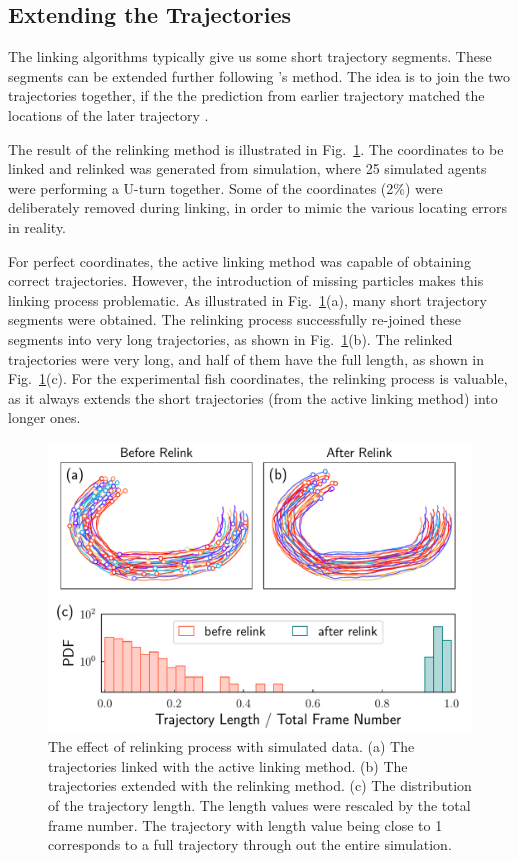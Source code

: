\documentclass[11pt,twoside]{report}
\begin{document}
\subsection{Extending the Trajectories}

The linking algorithms typically give us some short trajectory segments. These segments can be extended further following \citeauthor{xu2008}'s method. The idea is to join the two trajectories together, if the the prediction from earlier trajectory matched the locations of the later trajectory \cite{xu2008}.

The result of the relinking method is illustrated in Fig.~\ref{fig:relink}. The coordinates to be linked and relinked was generated from simulation, where 25 simulated agents were performing a U-turn together. Some of the coordinates (2\%) were deliberately removed during linking, in order to mimic the various locating errors in reality. 

For perfect coordinates, the active linking method was capable of obtaining correct trajectories. However, the introduction of missing particles makes this linking process problematic. As illustrated in Fig.~\ref{fig:relink}(a), many short trajectory segments were obtained. The relinking process successfully re-joined these segments into very long trajectories, as shown in Fig.~\ref{fig:relink}(b). The relinked trajectories were very long, and half of them have the full length, as shown in Fig.~\ref{fig:relink}(c). For the experimental fish coordinates, the relinking process is valuable, as it always extends the short trajectories (from the active linking method) into longer ones.


\begin{figure}
  \includegraphics[width=\linewidth]{relink}
  \caption[The effect of relinking]{
  	The effect of relinking process with simulated data.
  	(a) The trajectories linked with the active linking method.
  	(b) The trajectories extended with the relinking method.
  	(c) The distribution of the trajectory length. The length values were rescaled by the total frame number. The trajectory with length value being close to 1 corresponds to a full trajectory through out the entire simulation.
  }
  \label{fig:relink}
\end{figure}
\end{document}
